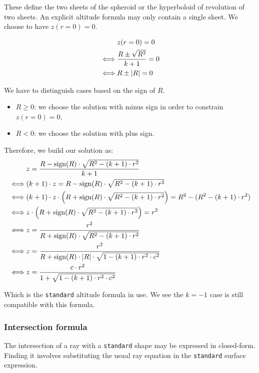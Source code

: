 These define the two sheets of the spheroid or the hyperboloid of revolution of
two sheets. An explicit altitude formula may only contain a single sheet. We
choose to have $z(r=0) = 0$.

\begin{equation} \begin{split}
& z(r=0) = 0 \\
\iff & \frac{R \pm \sqrt{R^2}}{k+1} = 0 \\
\iff & R \pm \abs{R} = 0
\end{split} \end{equation}

We have to distinguish cases based on the sign of $R$.
\begin{itemize}
\item $R \geq 0$: we choose the solution with minus sign in order to constrain
                  $z(r=0)=0$,
\item $R < 0$: we choose the solution with plus sign.
\end{itemize}

Therefore, we build our solution as:
\begin{equation} \begin{split}
& z = \frac{R - \textrm{sign}(R) \cdot \sqrt{R^2 - (k+1) \cdot r^2}}{k+1} \\
\iff & (k+1) \cdot z = R - \textrm{sign}(R) \cdot \sqrt{R^2 - (k+1) \cdot r^2}\\
\iff & (k+1) \cdot z \cdot \left( R + \textrm{sign}(R) \cdot
       \sqrt{R^2 - (k+1) \cdot r^2} \right) = R^2 - (R^2 - (k+1) \cdot r^2) \\
\iff & z \cdot \left( R + \textrm{sign}(R) \cdot
       \sqrt{R^2 - (k+1) \cdot r^2} \right) = r^2 \\
\iff & z = \frac{r^2}{R + \textrm{sign}(R) \cdot \sqrt{R^2 - (k+1) \cdot r^2}}\\
\iff & z = \frac{r^2}{R + \textrm{sign}(R) \cdot \abs{R} \cdot
                      \sqrt{1 - (k+1) \cdot r^2 \cdot c^2}} \\
\iff & z = \frac{c \cdot r^2}{1 + \sqrt{1 - (k+1) \cdot r^2 \cdot c^2}}
\end{split} \end{equation}

Which is the \lstinline{standard} altitude formula in use. We see the $k=-1$
case is still compatible with this formula.

\subsubsection{Intersection formula}
The intersection of a ray with a \lstinline{standard} shape may be expressed
in closed-form. Finding it involves substituting the usual ray equation in
the \lstinline{standard} surface expression.

